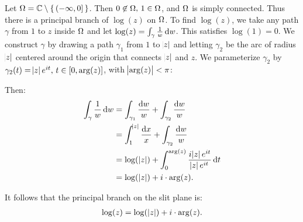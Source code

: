 \begin{example}
Let $\Omega = \mathbb{C} \setminus \set{(-\infty, 0 ] }$. Then $0 \not\in \Omega, \, 1 \in \Omega$, and $\Omega$ is simply connected. Thus there is a principal branch of $\log(z)$ on $\Omega$. To find $\log(z)$, we take any path $\gamma$ from $1$ to $z$ inside $\Omega$ and let $\log(z) = \int_\gamma \frac{1}{w} \dif w$. This satisfies $\log(1) = 0$. We construct $\gamma$ by drawing a path $\gamma_1$ from $1$ to $\abs{z}$ and letting $\gamma_2$ be the arc of radius $\abs{z}$ centered around the origin that connects $\abs{z}$ and $z$. We parameterize $\gamma_2$ by $\gamma_2(t) = \abs{z} e^{it}, \, t \in [0,\arg(z)]$, with $\abs{\arg(z)} < \pi$:

\begin{center}
\end{center}

Then:
\begin{align*}
    \int_{\gamma} \frac{1}{w} \dif w &= \int_{\gamma_1} \frac{\dif w}{w}  + \int_{\gamma_2} \frac{\dif w}{w}\\
    &= \int_1^{\abs{z}} \frac{\dif x}{x} + \int_{\gamma_2} \frac{\dif w}{w}\\
    &= \log( \, \abs{z}) + \int_0^{\arg(z)} \frac{i \abs{z} e^{it}}{\abs{z} e^{it}} \dif t\\
    &= \log( \, \abs{z}) + i \cdot {\arg(z)}.\\
\end{align*}

It follows that the principal branch on the slit plane is:
\begin{align*}
    \log(z) = \log( \, \abs{z} ) + i \cdot {\arg(z)}.
\end{align*}


\end{example}
